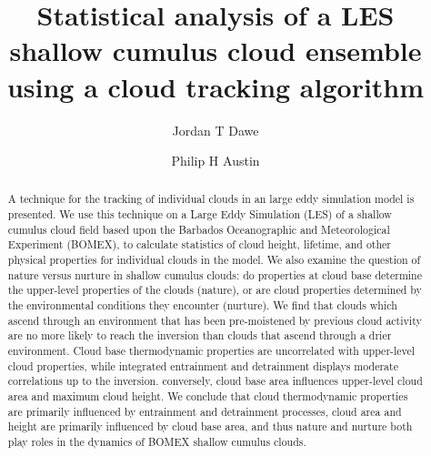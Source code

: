 \documentclass[acp]{copernicus}
\begin{document}
\title{Statistical analysis of a LES shallow cumulus cloud ensemble using a 
cloud tracking algorithm}


\author[1]{Jordan T Dawe}
\author[1]{Philip H Austin}










\received{}
\pubdiscuss{} %
\revised{}
\accepted{}
\published{}




\maketitle



\begin{abstract}
A technique for the tracking of individual clouds in an large eddy simulation 
model is presented.  We use this technique on a Large Eddy Simulation (LES) of 
a shallow cumulus cloud field based upon the Barbados Oceanographic and 
Meteorological Experiment (BOMEX), to calculate statistics of cloud height, 
lifetime, and other physical properties for individual clouds in the model.  We 
also examine the question of nature versus nurture in shallow cumulus clouds: 
do properties at cloud base determine the upper-level properties of the clouds 
(nature), or are cloud properties determined by the environmental conditions 
they encounter (nurture).  We find that clouds which ascend through an 
environment that has been pre-moistened by previous cloud activity are no more 
likely to reach the inversion than clouds that ascend through a drier 
environment.  Cloud base thermodynamic properties are uncorrelated with 
upper-level cloud properties, while integrated entrainment and detrainment
displays moderate correlations up to the inversion.  conversely, cloud base area 
influences upper-level cloud area and maximum cloud height.  We conclude that 
cloud thermodynamic properties are primarily influenced by entrainment and 
detrainment processes, cloud area and height are primarily influenced by cloud 
base area, and thus nature and nurture both play roles in the dynamics of 
BOMEX shallow cumulus clouds.
\end{abstract}
\end{document}
